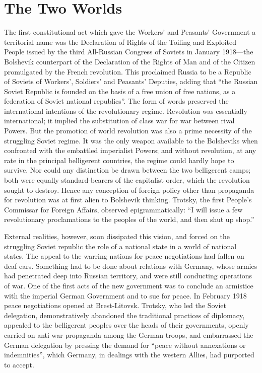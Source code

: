 \chapter{The Two Worlds}

The first constitutional act which gave the Workers' and Peasants' Government a territorial name was the Declaration of Rights of the Toiling and Exploited People issued by the third All-Russian Congress of Soviets in January 1918---the Bolshevik counterpart of the Declaration of the Rights of Man and of the Citizen promulgated by the French revolution. This proclaimed Russia to be a Republic of Soviets of Workers', Soldiers' and Peasants' Deputies, adding that ``the Russian Soviet Republic is founded on the basis of a free union of free nations, as a federation of Soviet national republics''. The form of words preserved the international intentions of the revolutionary regime. Revolution was essentially international; it implied the substitution of class war for war between rival Powers. But the promotion of world revolution was also a prime necessity of the struggling Soviet regime. It was the only weapon available to the Bolsheviks when confronted with the embattled imperialist Powers; and without revolution, at any rate in the principal belligerent countries, the regime could hardly hope to survive. Nor could any distinction be drawn between the two belligerent camps; both were equally standard-bearers of the capitalist order, which the revolution sought to destroy. Hence any conception of foreign policy other than propaganda for revolution was at first alien to Bolshevik thinking. Trotsky, the first People's Commissar for Foreign Affairs, observed epigrammatically: ``I will issue a few revolutionary proclamations to the peoples of the world, and then shut up shop.'' 

External realities, however, soon dissipated this vision, and forced on the struggling Soviet republic the role of a national state in a world of national states. The appeal to the warring nations for peace negotiations had fallen on deaf ears. Something had to be done about relations with Germany, whose armies had penetrated deep into Russian territory, and were still conducting operations of war. One of the first acts of the new government was to conclude an armistice with the imperial German Government and to sue for peace. In February 1918 peace negotiations opened at Brest-Litovsk. Trotsky, who led the Soviet delegation, demonstratively abandoned the traditional practices of diplomacy, appealed to the belligerent peoples over the heads of their governments, openly carried on anti-war propaganda among the German troops, and embarrassed the German delegation by pressing the demand for ``peace without annexations or indemnities'', which Germany, in dealings with the western Allies, had purported to accept. 

